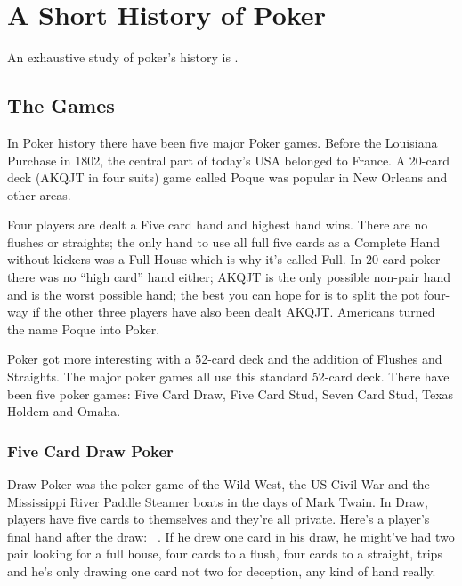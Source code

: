 \chapter{A Short History of Poker}

An exhaustive study of poker's history is \citet{McManus}.

\section{The Games}

In Poker history there have been five major Poker games.
Before the Louisiana Purchase in 1802, the central part of today's USA
belonged to France. A 20-card deck (AKQJT in four suits) game called
Poque was popular in New Orleans and other areas.

Four players are dealt a Five card hand and highest hand wins. There
are no flushes or straights; the only hand to use all full five cards
as a Complete Hand without kickers was a Full House which is why it's
called Full. In 20-card poker there was no ``high card'' hand either;
AKQJT is the only possible non-pair hand and is the worst possible
hand; the best you can hope for is to split the pot four-way if the
other three players have also been dealt AKQJT. Americans turned the
name Poque into Poker.

Poker got more interesting with a 52-card deck and the addition of
Flushes and Straights. The major poker games all use this standard
52-card deck. There have been five poker games: Five Card Draw, Five
Card Stud, Seven Card Stud, Texas Holdem and Omaha.



\subsection{Five Card Draw Poker}

Draw Poker was the poker game of the Wild West, the US Civil War and
the Mississippi River Paddle Steamer boats in the days of Mark Twain.
In Draw, players have five cards to themselves and they're
all private. Here's a player's final hand after the draw:
\back\back\back\back\back\ . If he drew one card in his draw,
he might've had two pair looking for a full house, four cards to a
flush, four cards to a straight, trips and he's only drawing one card
not two for deception, any kind of hand really.

